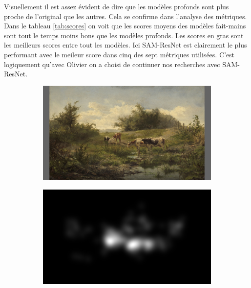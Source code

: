 \par
Visuellement il est assez évident de dire que les modèles profonds sont plus proche de l'original que les autres. Cela se confirme dans l'analyse des métriques. Dans le tableau \ref{tab:scores} on voit que les scores moyens des modèles fait-mains sont tout le temps moins bons que les modèles profonds. Les scores en gras sont les meilleurs scores entre tout les modèles. Ici SAM-ResNet est clairement le plus performant avec le meileur score dans cinq des sept métriques utilisées. C'est logiquement qu'avec Olivier on a choisi de continuer nos recherches avec SAM-ResNet.

\vfill

\begin{figure}[ht]
    \centering
    \begin{subfigure}{0.24\textwidth}
        \includegraphics[width=\linewidth]{datas/predictions/stimulus_cows_at_a_pond_Bilders_1856.jpg}
        \caption{}
    \end{subfigure}
    \begin{subfigure}{0.24\textwidth}
        \includegraphics[width=\linewidth]{datas/predictions/human_cows_at_a_pond_Bilders_1856.jpg}
        \caption{}
    \end{subfigure}


\end{figure}
